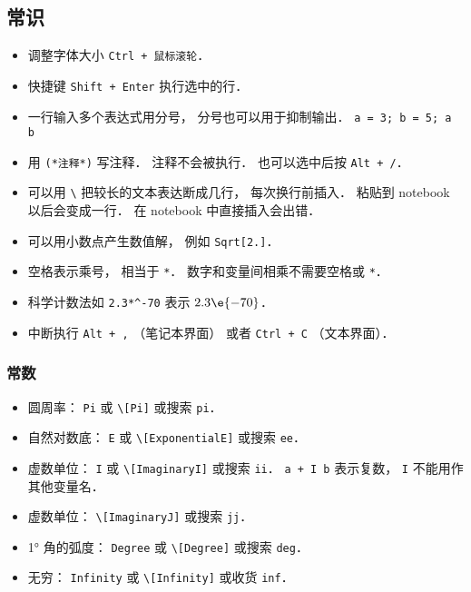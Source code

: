 
\begin{issues}
\issueDraft
\end{issues}


\subsection{常识}
\begin{itemize}
\item 调整字体大小 \verb|Ctrl + 鼠标滚轮|．
\item 快捷键 \verb|Shift + Enter| 执行选中的行．
\item 一行输入多个表达式用分号， 分号也可以用于抑制输出． \verb|a = 3; b = 5; a b|
\item 用 \verb|(*注释*)| 写注释． 注释不会被执行． 也可以选中后按 \verb|Alt + /|．
\item 可以用 \verb|\| 把较长的文本表达断成几行， 每次换行前插入． 粘贴到 notebook 以后会变成一行． 在 notebook 中直接插入会出错．
\item 可以用小数点产生数值解， 例如 \verb|Sqrt[2.]|．
\item 空格表示乘号， 相当于 \verb|*|． 数字和变量间相乘不需要空格或 \verb|*|．
\item 科学计数法如 \verb|2.3*^-70| 表示 $2.3\e{-70}$．
\item 中断执行 \verb|Alt + ,| （笔记本界面） 或者 \verb|Ctrl + C| （文本界面）．
\end{itemize}

\subsubsection{常数}

\begin{itemize}
\item 圆周率： \verb|Pi| 或 \verb|\[Pi]| 或搜索 \verb|pi|．
\item 自然对数底： \verb|E| 或 \verb|\[ExponentialE]| 或搜索 \verb|ee|．
\item 虚数单位： \verb|I| 或 \verb|\[ImaginaryI]| 或搜索 \verb|ii|． \verb|a + I b| 表示复数， \verb|I| 不能用作其他变量名．
\item 虚数单位： \verb|\[ImaginaryJ]| 或搜索 \verb|jj|．
\item 1° 角的弧度： \verb|Degree| 或 \verb|\[Degree]| 或搜索 \verb|deg|．
\item 无穷： \verb|Infinity| 或 \verb|\[Infinity]| 或收货 \verb|inf|．
\end{itemize}

